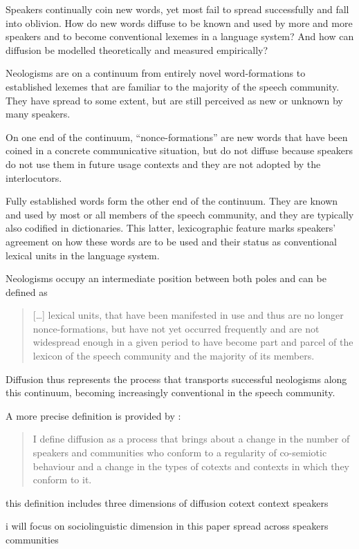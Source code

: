 \documentclass[draft, a4paper, abstract=on]{scrartcl}
\begin{document}
Speakers continually coin new words, yet most fail to spread successfully and fall into oblivion. How do new words diffuse to be known and used by more and more speakers and to become conventional lexemes in a language system? And how can diffusion be modelled theoretically and measured empirically?

Neologisms are on a continuum from entirely novel word-formations to established lexemes that are familiar to the majority of the speech community. They have spread to some extent, but are still perceived as new or unknown by many speakers.

On one end of the continuum, \enquote{nonce-formations} are new words that have been coined in a concrete communicative situation, but do not diffuse because speakers do not use them in future usage contexts and they are not adopted by the interlocutors.~\parencite{Hohenhaus1996AdhocwortbildungTerminologie}

Fully established words form the other end of the continuum. They are known and used by most or all members of the speech community, and they are typically also codified in dictionaries. This latter, lexicographic feature marks speakers' agreement on how these words are to be used and their status as conventional lexical units in the language system.

Neologisms occupy an intermediate position between both poles and can be defined as

\blockquote[{\cite[31]{Kerremans2015WebNew}}]{
[\dots] lexical units, that have been manifested in use and thus are no longer nonce-formations, but have not yet occurred frequently and are not widespread enough in a given period to have become part and parcel of the lexicon of the speech community and the majority of its members.
}

Diffusion thus represents the process that transports successful neologisms along this continuum, becoming increasingly conventional in the speech community.

A more precise definition is provided by \citeauthor{Schmid2020DynamicsLinguistic}: \blockquote[\cite{Schmid2020DynamicsLinguistic}]{I define diffusion as a process that brings about a change in the number of speakers and communities who conform to a regularity of co-semiotic behaviour and a change in the types of cotexts and contexts in which they conform to it.} 
this definition includes three dimensions of diffusion
cotext
context
speakers

i will focus on sociolinguistic dimension in this paper
spread across
speakers
communities
\end{document}
